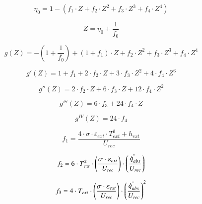 \begin{equation}
    \eta_{0} = 1 - (f_{1} \cdot Z + f_{2} \cdot Z^{2} + f_{3} \cdot Z^{3} + f_{4} \cdot Z^{4})
    \label{eq:rendimiento0}
\end{equation}

\begin{equation}
    Z = \eta_{0} + \frac{1}{f_{0}} 
    \label{eq:zeta}
\end{equation}

\begin{equation}
    g(Z) = -\left(1+\frac{1}{f_{0}}\right)+(1+f_{1})\cdot Z + f_{2}\cdot Z^{2} +  f_{3}\cdot Z^{3} + f_{4}\cdot Z^{4} 
    \label{eq:gdezeta}
\end{equation}

\begin{equation}
    g'(Z) = 1 + f_{1} + 2 \cdot f_{2} \cdot Z + 3 \cdot f_{3} \cdot Z^{2} + 4 \cdot f_{4} \cdot Z^{3} 
    \label{eq:gprimadezeta}
\end{equation}

\begin{equation}
    g''(Z) = 2 \cdot f_{2} \cdot Z + 6 \cdot f_{3} \cdot Z + 12 \cdot f_{4} \cdot Z^{2} 
    \label{eq:g2primadezeta}
\end{equation}

\begin{equation}
    g'''(Z) = 6 \cdot f_{3} + 24 \cdot f_{4} \cdot Z
    \label{eq:g3primadezeta}
\end{equation}

\begin{equation}
    g^{IV}(Z) = 24 \cdot f_{4}
    \label{eq:g4primadezeta}
\end{equation}

\begin{equation}
    f_{1} = \frac{4 \cdot \sigma \cdot \varepsilon_{ext} \cdot T_{ext}^{3} + h_{ext}}{U_{rec}}
    \label{eq:f1}
\end{equation}

\begin{equation}
    f_{2} = 6 \cdot T_{ext}^{2} \cdot \left(\frac{\sigma \cdot \varepsilon_{ext}}{U_{rec}} \right) \cdot \left(\frac{\dot{q}^{"}_{abs}}{U_{rec}}\right) 
    \label{eq:f2}
\end{equation}

\begin{equation}
    f_{3} = 4 \cdot T_{ext} \cdot \left(\frac{\sigma \cdot \varepsilon_{ext}}{U_{rec}} \right) \cdot \left(\frac{\dot{q}^{"}_{abs}}{U_{rec}}\right)^{2} 
    \label{eq:f3}
\end{equation}

